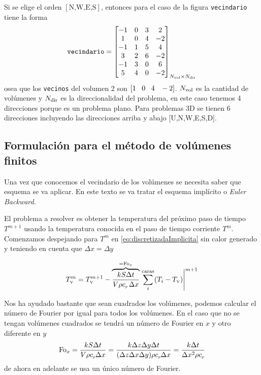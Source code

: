 \documentclass[11pt, titlepage]{article}
\begin{document}
Si se elige el orden $[\text{N,W,E,S}]$, entonces para el caso de la figura \texttt{vecindario} tiene la forma 
\begin{equation}
    \texttt{vecindario} =  \begin{bmatrix}
        -1 & 0 & 3 & 2 \\
        1 & 0 & 4 & -2 \\
        -1 & 1 & 5  &4   \\
        3 & 2 & 6 &-2  \\
        -1 & 3 & 0 & 6 \\
        5  & 4  & 0 & -2
    \end{bmatrix}_{N_{\text{vol}}\times N_{\text{dir}}}
\end{equation}
osea que los \texttt{vecinos} del volumen 2 son $[1\;\;\; 0\;\;\; 4\;\;\;-2]$. $N_{\text{vol}}$ es la cantidad de volúmenes y $N_{\text{dir}}$ es la direccionalidad del problema, en este caso tenemos 4 direcciones porque es un problema plano. Para problemas 3D se tienen 6 direcciones incluyendo las direcciones arriba y abajo [U,N,W,E,S,D].

\subsection{Formulación para el método de volúmenes finitos}
Una vez que conocemos el vecindario de los volúmenes se necesita saber que esquema se va aplicar. En este texto se va tratar el esquema implícito o \textit{Euler Backward}.

El problema a resolver es obtener la temperatura del próximo paso de tiempo $T^{m+1}$ usando la temperatura conocida en el paso de tiempo corriente $T^{m}$. Comenzamos despejando para $T^m$ en \eqref{eq:discretizadaImplicita} sin calor generado y teniendo en cuenta que $\Delta x = \Delta y$

\begin{equation} \label{eq:volfin1}
    T_{\text{\tiny V}}^m =T_{\text{\tiny V}}^{m+1} - \overbrace{\frac{k S \Delta t}{V \rho {c_{\textit{\tiny p}}}\,\Delta x} }^{={\mathrm{Fo}}_x}\left.\sum_i^{\text{caras}}(T_i-T_{\text{\tiny V}})\right|^{m+1}
\end{equation}

Nos ha ayudado bastante que sean cuadrados los volúmenes, podemos calcular el número de Fourier por igual para todos los volúmenes. En el caso que no se tengan volúmenes cuadrados se tendrá un número de Fourier en $x$ y otro diferente en $y$
\begin{equation*}
    {\mathrm{Fo}}_x= \frac{k S \Delta t}{V \rho {c_{\textit{\tiny p}}} \Delta x} = \frac{k \Delta z \Delta y \Delta t}{(\Delta z \Delta x \Delta y) \rho {c_{\textit{\tiny p}}} \Delta x} = \frac{k \Delta t}{ \Delta x^2 \rho {c_{\textit{\tiny p}}}}
\end{equation*}
de ahora en adelante se usa un único número de Fourier.
\end{document}
